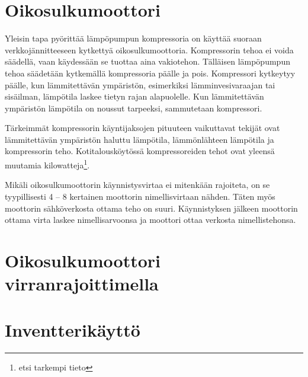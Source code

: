   \section{Oikosulkumoottori}
    Yleisin tapa pyörittää lämpöpumpun kompressoria on käyttää suoraan verkkojännitteeseen kytkettyä oikosulkumoottoria. Kompressorin tehoa ei voida säädellä, vaan käydessään se tuottaa aina vakiotehon. Tälläisen lämpöpumpun tehoa säädetään kytkemällä kompressoria päälle ja pois. Kompressori kytkeytyy päälle, kun lämmitettävän ympäristön, esimerkiksi lämminvesivaraajan tai sisäilman, lämpötila laskee tietyn rajan alapuolelle. Kun lämmitettävän ympäristön lämpötila on noussut tarpeeksi, sammutetaan kompressori.

    Tärkeimmät kompressorin käyntijaksojen pituuteen vaikuttavat tekijät ovat lämmitettävän ympäristön haluttu lämpötila, lämmönlähteen lämpötila ja kompressorin teho. Kotitalousköytössä kompressoreiden tehot ovat yleensä muutamia kilowatteja\footnote{etsi tarkempi tieto}.

    Mikäli oikosulkumoottorin käynnistysvirtaa ei mitenkään rajoiteta, on se tyypillisesti 4 -- 8 kertainen moottorin nimellisvirtaan nähden. Täten myös moottorin sähköverkosta ottama teho on suuri.\parencite{rautiainen} Käynnistyksen jälkeen moottorin ottama virta laskee nimellisarvoonsa ja moottori ottaa verkosta nimellistehonsa.

  \section{Oikosulkumoottori virranrajoittimella}

  \section{Inventterikäyttö}
